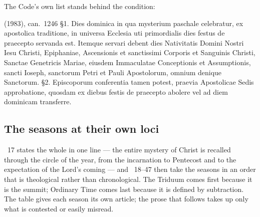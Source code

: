 The Code's own list stands behind the condition:

\begin{normtext}{ (1983), can.\ 1246}
\S1. Dies dominica in qua mysterium paschale celebratur, ex apostolica traditione, in universa
Ecclesia uti primordialis dies festus de praecepto servanda est. Itemque servari debent dies
Nativitatis Domini Nostri Iesu Christi, Epiphaniae, Ascensionis et sanctissimi Corporis et Sanguinis
Christi, Sanctae Genetricis Mariae, eiusdem Immaculatae Conceptionis et Assumptionis, sancti Ioseph,
sanctorum Petri et Pauli Apostolorum, omnium denique Sanctorum. \S2. Episcoporum conferentia tamen
potest, praevia Apostolicae Sedis approbatione, quosdam ex diebus festis de praecepto abolere vel ad
diem dominicam transferre.
\end{normtext}

\subsection{The seasons at their own loci}

~17 states the whole in one line --- the entire mystery of Christ is recalled through the
circle of the year, from the incarnation to Pentecost and to the expectation of the Lord's coming
--- and ~18--47 then take the seasons in an order that is theological rather than
chronological. The Triduum comes first because it is the summit; Ordinary Time comes last because
it is defined by subtraction. The table gives each season its own article; the prose that follows
takes up only what is contested or easily misread.

